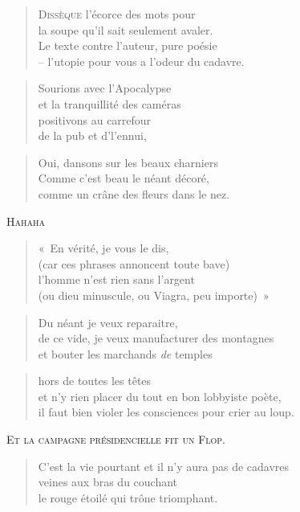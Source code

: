   \begin{verse}
    \textsc{Dissèque} l’écorce des mots pour\\
    la soupe qu’il sait seulement avaler.\\
    Le texte contre l’auteur, pure poésie\\
    -- l’utopie pour vous a l’odeur du cadavre.
  \end{verse}
  \begin{verse}
    Sourions avec l’Apocalypse\\
    et la tranquillité des caméras\\
    positivons au carrefour\\
    de la pub et d’l’ennui,
  \end{verse}
  \begin{verse}
    Oui, dansons sur les beaux charniers\\
    Comme c’est beau le néant décoré,\\
    comme un crâne des fleurs dans le nez.
  \end{verse}
  \begin{center}
    \textsc{Hahaha}
  \end{center}
  \begin{verse}
    «~En vérité, je vous le dis,\\
    (car ces phrases annoncent toute bave)\\
    l’homme n’est rien sans l’argent\\
    (ou dieu minuscule, ou Viagra, peu importe)~»
  \end{verse}
  \begin{verse}
    Du néant je veux reparaitre,\\
    de ce vide, je veux manufacturer des montagnes\\
    et bouter les marchands \emph{de} temples
  \end{verse}
  \begin{verse}
    hors de toutes les têtes\\
    et n’y rien placer du tout en bon lobbyiste poète,\\
    il faut bien violer les consciences pour crier au loup.
  \end{verse}
  \begin{center}
    \textsc{Et la campagne présidencielle fit un Flop.}
  \end{center}
  \begin{verse}
    C’est la vie pourtant et il n’y aura pas de cadavres\\
    veines aux bras du couchant\\
    le rouge étoilé qui trône triomphant.
  \end{verse}
